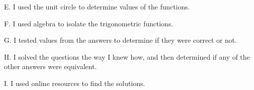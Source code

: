 \documentclass{ximera}
\begin{document}
\begin{question}
\begin{question}
    E. I used the unit circle to determine values of the functions.

    \begin{multipleChoice}
    \end{multipleChoice}
    
\end{question}

\begin{question}
    
    F. I used algebra to isolate the trigonometric functions.

    \begin{multipleChoice}
    \end{multipleChoice}
    
\end{question}

\begin{question}
    
    G. I tested values from the answers to determine if they were correct or not.

    \begin{multipleChoice}
    \end{multipleChoice}
    
\end{question}

\begin{question}
    
    H. I solved the questions the way I knew how, and then determined if any of the other answers were equivalent.

    \begin{multipleChoice}
    \end{multipleChoice}
    
\end{question}

\begin{question}
    
    I. I used online resources to find the solutions.

    \begin{multipleChoice}
    \end{multipleChoice}
    
\end{question}
\begin{question}    
    

\end{question}
\end{question}
\end{document}
